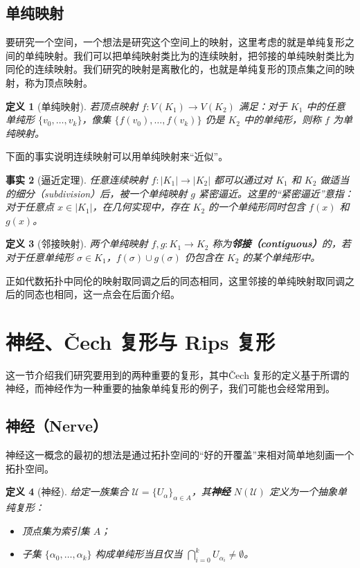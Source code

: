 \documentclass[UTF8]{ctexart}
\newtheorem{definition}{定义}[section]
\newtheorem{fact}[definition]{事实}
\begin{document}
\subsection{单纯映射}
\label{subsec:simplicial-map}
要研究一个空间，一个想法是研究这个空间上的映射，这里考虑的就是单纯复形之间的单纯映射。我们可以把单纯映射类比为的连续映射，把邻接的单纯映射类比为同伦的连续映射。我们研究的映射是离散化的，也就是单纯复形的顶点集之间的映射，称为顶点映射。
\begin{definition}[单纯映射]
\label{def:simplicial-map}
若顶点映射 \(f: V(K_1) \to V(K_2)\) 满足：对于 \(K_1\) 中的任意单纯形 \(\{v_0,\dots,v_k\}\)，像集 \(\{f(v_0),\dots,f(v_k)\}\) 仍是 \(K_2\) 中的单纯形，则称 \(f\) 为单纯映射。
\end{definition}
下面的事实说明连续映射可以用单纯映射来“近似”。
\begin{fact}[逼近定理]
\label{fact:approximation}
任意连续映射 \(f: |K_1| \to |K_2|\) 都可以通过对 \(K_1\) 和 \(K_2\) 做适当的细分（subdivision）后，被一个单纯映射 \(g\) 紧密逼近。这里的“紧密逼近”意指：对于任意点 \(x \in |K_1|\)，在几何实现中，存在 \(K_2\) 的一个单纯形同时包含 \(f(x)\) 和 \(g(x)\)。
\end{fact}

\begin{definition}[邻接映射]
\label{def:contiguous-map}
两个单纯映射 \(f, g: K_1 \to K_2\) 称为\textbf{邻接（contiguous）}的，若对于任意单纯形 \(\sigma \in K_1\)，\(f(\sigma) \cup g(\sigma)\) 仍包含在 \(K_2\) 的某个单纯形中。
\end{definition}
正如代数拓扑中同伦的映射取同调之后的同态相同，这里邻接的单纯映射取同调之后的同态也相同，这一点会在后面介绍。

\section{神经、Čech 复形与 Rips 复形}
\label{sec:nerve-cech-rips}
这一节介绍我们研究要用到的两种重要的复形，其中Čech 复形的定义基于所谓的神经，而神经作为一种重要的抽象单纯复形的例子，我们可能也会经常用到。
\subsection{神经（Nerve）}
\label{subsec:nerve}
神经这一概念的最初的想法是通过拓扑空间的“好的开覆盖”来相对简单地刻画一个拓扑空间。
\begin{definition}[神经]
\label{def:nerve}
给定一族集合 \(\mathcal{U} = \{U_\alpha\}_{\alpha \in A}\)，其\textbf{神经} \(N(\mathcal{U})\) 定义为一个抽象单纯复形：
\begin{itemize}
    \item 顶点集为索引集 \(A\)；
    \item 子集 \(\{\alpha_0, \dots, \alpha_k\}\) 构成单纯形当且仅当 \(\bigcap_{i=0}^k U_{\alpha_i} \neq \emptyset\)。
\end{itemize}
\end{definition}
\end{document}
